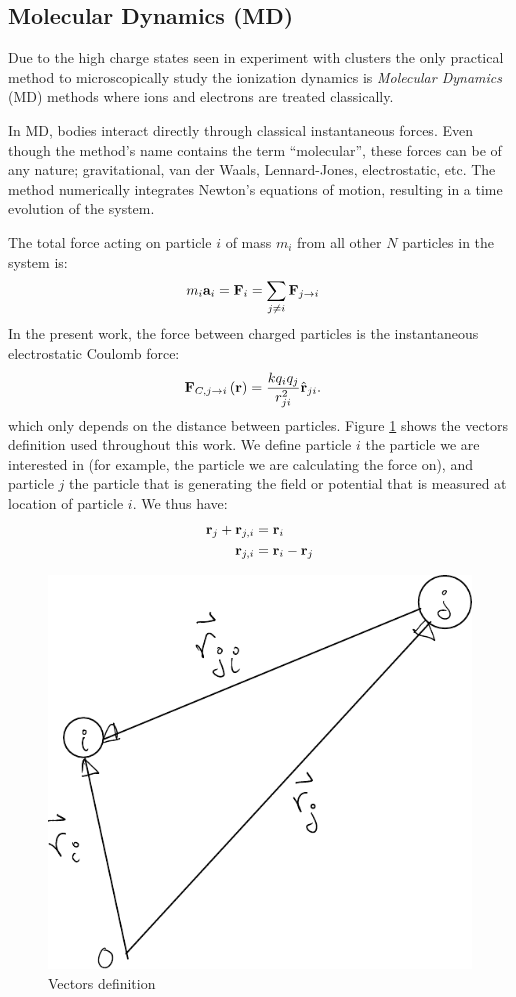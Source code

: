 

\subsection{Molecular Dynamics (MD)}
\label{section:tools:md}

Due to the high charge states seen in experiment with clusters the only
practical method to microscopically study the ionization dynamics is
\textit{Molecular Dynamics} (MD) methods where ions and electrons are treated
classically.

In MD, bodies interact directly through classical instantaneous forces. Even
though the method's name contains the term ``molecular'', these forces can be
of any nature; gravitational, van der Waals, Lennard-Jones, electrostatic, etc.
The method numerically integrates Newton's equations of motion, resulting in a
time evolution of the system.

The total force acting on particle $i$ of mass $m_i$ from all other $N$
particles in the system is:
\begin{align}
m_i \textbf{a}_i & = \textbf{F}_i = \sum_{j \ne i} \textbf{F}_{j \rightarrow i}
\label{eqn:md:newton}
\end{align}
In the present work, the force between charged particles is the instantaneous
electrostatic Coulomb force:
\begin{align}
\textbf{F}_{C,j \rightarrow i}\left( \textbf{r} \right) & =\frac{k q_i q_j}{r_{ji}^2} \hat{\textbf{r}}_{ji}.
\label{eqn:md:coulomb:F}
\end{align}
which only depends on the distance between particles. Figure
\ref{fig:md:vectors} shows the vectors definition used throughout this work. We
define particle $i$ the particle we are interested in (for example, the
particle we are calculating the force on), and particle $j$ the particle that
is generating the field or potential that is measured at location of particle
$i$. We thus have:
\begin{align}
\textbf{r}_{j} + \textbf{r}_{j,i} & = \textbf{r}_{i} \\
\textbf{r}_{j,i} & = \textbf{r}_{i} - \textbf{r}_{j}
\end{align}

\begin{figure}
 \centering
 \includegraphics[width=0.38\columnwidth]{figures/mockups/vectors}
 \caption{Vectors definition}
 \label{fig:md:vectors}
\end{figure}



